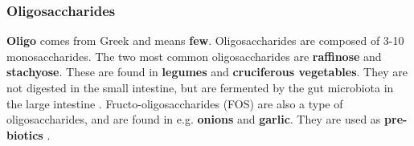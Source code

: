 \subsubsection*{Oligosaccharides}
\textbf{Oligo} comes from Greek and means \textbf{few}. Oligosaccharides are composed of 3-10 monosaccharides. The two most common oligosaccharides are \textbf{raffinose} and \textbf{stachyose}. These are found in \textbf{legumes} and \textbf{cruciferous vegetables}. They are not digested in the small intestine, but are fermented by the gut microbiota in the large intestine \cite*{BKR_02}. Fructo-oligosaccharides (FOS) are also a type of oligosaccharides, and are found in e.g. \textbf{onions} and \textbf{garlic}. They are used as \textbf{pre-biotics} \cite*{BKR_02}.




